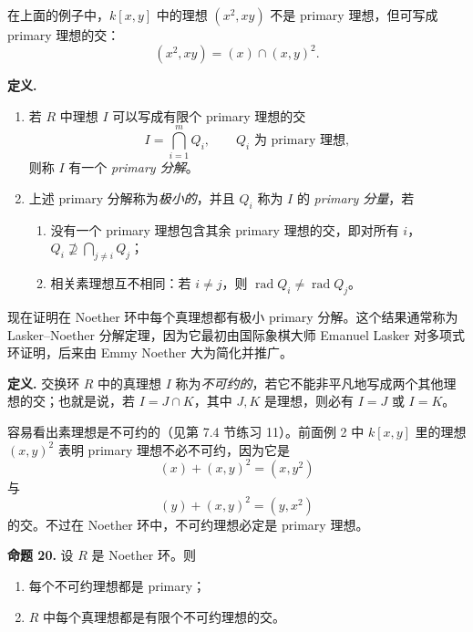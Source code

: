 在上面的例子中，$k[x,y]$ 中的理想 $(x^2,xy)$ 不是 primary 理想，但可写成 primary 理想的交：
\[
(x^2,xy)=(x)\cap(x,y)^2.
\]

\noindent\textbf{定义.}
\begin{enumerate}[label=(\arabic*)]
	\item 若 $R$ 中理想 $I$ 可以写成有限个 primary 理想的交
	\[
	I=\bigcap_{i=1}^m Q_i,
	\qquad Q_i\text{ 为 primary 理想},
	\]
	则称 $I$ 有一个 \emph{primary 分解}。
	\item 上述 primary 分解称为\emph{极小的}，并且 $Q_i$ 称为 $I$ 的 \emph{primary 分量}，若
	\begin{enumerate}[label=(\alph*)]
		\item 没有一个 primary 理想包含其余 primary 理想的交，即对所有 $i$，$Q_i\not\supseteq\bigcap_{j\ne i}Q_j$；
		\item 相关素理想互不相同：若 $i\ne j$，则 $\operatorname{rad}Q_i\ne\operatorname{rad}Q_j$。
	\end{enumerate}
\end{enumerate}

现在证明在 Noether 环中每个真理想都有极小 primary 分解。这个结果通常称为 Lasker--Noether 分解定理，因为它最初由国际象棋大师 Emanuel Lasker 对多项式环证明，后来由 Emmy Noether 大为简化并推广。

\noindent\textbf{定义.} 交换环 $R$ 中的真理想 $I$ 称为\emph{不可约的}，若它不能非平凡地写成两个其他理想的交；也就是说，若 $I=J\cap K$，其中 $J,K$ 是理想，则必有 $I=J$ 或 $I=K$。

容易看出素理想是不可约的（见第 7.4 节练习 11）。前面例 2 中 $k[x,y]$ 里的理想 $(x,y)^2$ 表明 primary 理想不必不可约，因为它是
\[
(x)+(x,y)^2=(x,y^2)
\]
与
\[
(y)+(x,y)^2=(y,x^2)
\]
的交。不过在 Noether 环中，不可约理想必定是 primary 理想。

\noindent\textbf{命题 20.} 设 $R$ 是 Noether 环。则
\begin{enumerate}[label=(\arabic*)]
	\item 每个不可约理想都是 primary；
	\item $R$ 中每个真理想都是有限个不可约理想的交。
\end{enumerate}

